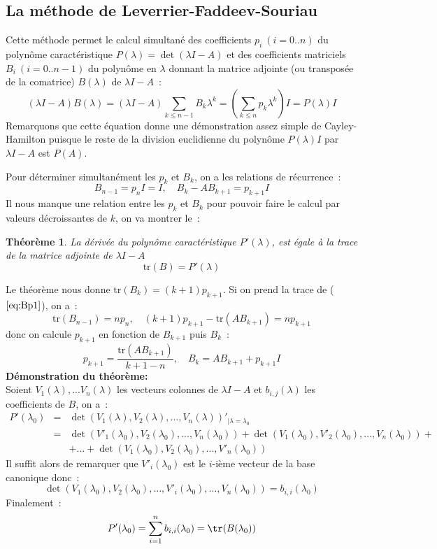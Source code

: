 \documentclass[a4paper,11pt]{book}
\newtheorem{thm}{Théorème}
\begin{document}
\begin{giacjshere}
\subsection{La m\'ethode de
  Leverrier-Faddeev-Souriau} 
Cette m\'ethode permet le calcul simultan\'e des coefficients 
$p_i \ (i=0..n)$ du polyn\^ome caract\'eristique 
$P(\lambda)=\det(\lambda I-A)$  et des coefficients matriciels
$B_i \ (i=0..n-1)$ du polyn\^ome en $\lambda$ donnant la matrice adjointe
(ou transpos\'ee de la comatrice) $B(\lambda)$ de $\lambda I -A$~:
\begin{equation} \label{eq:Bp}
 (\lambda I -A)B(\lambda)=(\lambda I -A) \sum_{k\leq n-1} B_k \lambda^k
= (\sum_{k\leq n} p_k \lambda^k)I =P(\lambda)I
\end{equation}
Remarquons que cette équation donne une démonstration assez simple
de Cayley-Hamilton puisque le reste de la division euclidienne
du polynôme $P(\lambda)I$ par $\lambda I -A $ est $P(A)$.

Pour déterminer simultanément les $p_k$ et $B_k$,
on a les relations de récurrence~:
\begin{equation}
\label{eq:Bp1} B_{n-1}=p_n I=I, \quad B_k-AB_{k+1}=p_{k+1} I
\end{equation}
Il nous manque une relation entre les $p_k$ et $B_k$ pour pouvoir
faire le calcul par valeurs décroissantes de $k$, on va montrer le~:
\begin{thm}
La d\'eriv\'ee  du polyn\^ome caract\'eristique $P'(\lambda)$,
est \'egale \`a la trace de la matrice adjointe 
de $\lambda I-A$
\[ \mbox{tr}(B)=P'(\lambda) \]
\end{thm}
Le théorème nous donne $\mbox{tr}(B_k) = (k+1)p_{k+1} $.
Si on prend la trace de (\(\ref{eq:Bp1}\)), on a~:
\[ \mbox{tr}(B_{n-1})=n p_n, \quad (k+1)p_{k+1} -\mbox{tr}(AB_{k+1})
=np_{k+1} \]
donc on calcule $p_{k+1}$ en fonction de $B_{k+1}$ puis $B_k$~:
\[ p_{k+1}=\frac{\mbox{tr}(AB_{k+1})}{k+1-n}, 
\quad B_k=AB_{k+1}+p_{k+1} I \]
{\bf D\'emonstration du théorème:}\\
Soient $V_1(\lambda),...V_n(\lambda)$ les vecteurs colonnes 
de $\lambda I-A$ et $b_{i,j}(\lambda)$ les coefficients de $B$, on a~:
\begin{eqnarray*}
P'(\lambda_0) &=& \det(V_1(\lambda),V_2(\lambda),...,V_n(\lambda) )'
_{|\lambda=\lambda_0}\\
&=&\det(V'_1(\lambda_0),V_2(\lambda_0),...,V_n(\lambda_0) )+
\det(V_1(\lambda_0),V'_2(\lambda_0),...,V_n(\lambda_0) )+ \\
& & +...+\det(V_1(\lambda_0),V_2(\lambda_0),...,V'_n(\lambda_0) )
\end{eqnarray*}
Il suffit alors de remarquer que
$V'_i(\lambda_0)$ est le $i$-ième vecteur de la base canonique donc~:
\[ \det(V_1(\lambda_0),V_2(\lambda_0),...,V'_i(\lambda_0),...,V_n(\lambda_0) )
=b_{i,i}(\lambda_0) \]
Finalement~:
\[P'(\lambda_0)=\sum_{i=1}^n b_{i,i}(\lambda_0)=\tr(B(\lambda_0)) \]


\end{giacjshere}
\end{document}
